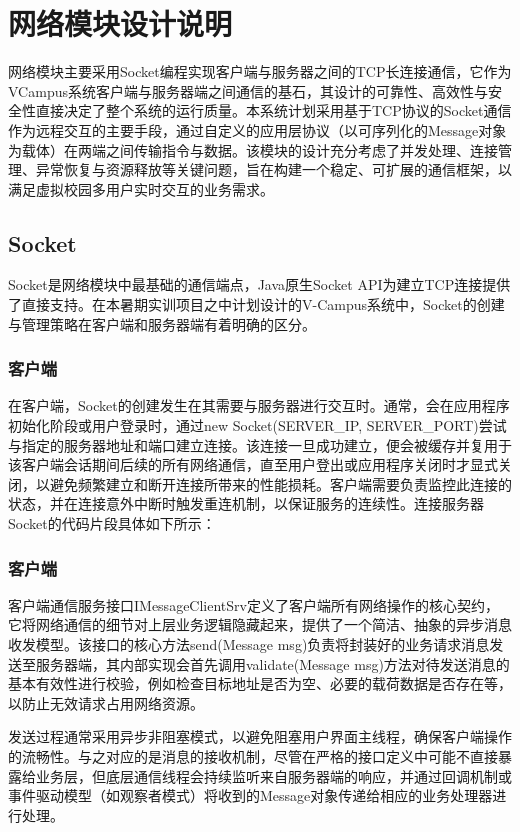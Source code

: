 \ifx\maindoc\undefined
{}
\fi

\section{网络模块设计说明}
网络模块主要采用Socket编程实现客户端与服务器之间的TCP长连接通信，它作为VCampus系统客户端与服务器端之间通信的基石，其设计的可靠性、高效性与安全性直接决定了整个系统的运行质量。本系统计划采用基于TCP协议的Socket通信作为远程交互的主要手段，通过自定义的应用层协议（以可序列化的Message对象为载体）在两端之间传输指令与数据。该模块的设计充分考虑了并发处理、连接管理、异常恢复与资源释放等关键问题，旨在构建一个稳定、可扩展的通信框架，以满足虚拟校园多用户实时交互的业务需求。
\subsection{Socket}
Socket是网络模块中最基础的通信端点，Java原生Socket API为建立TCP连接提供了直接支持。在本暑期实训项目之中计划设计的V-Campus系统中，Socket的创建与管理策略在客户端和服务器端有着明确的区分。
\subsubsection{客户端}
在客户端，Socket的创建发生在其需要与服务器进行交互时。通常，会在应用程序初始化阶段或用户登录时，通过new Socket(SERVER_IP, SERVER_PORT)尝试与指定的服务器地址和端口建立连接。该连接一旦成功建立，便会被缓存并复用于该客户端会话期间后续的所有网络通信，直至用户登出或应用程序关闭时才显式关闭，以避免频繁建立和断开连接所带来的性能损耗。客户端需要负责监控此连接的状态，并在连接意外中断时触发重连机制，以保证服务的连续性。连接服务器Socket的代码片段具体如下所示：

\subsubsection{客户端}
客户端通信服务接口IMessageClientSrv定义了客户端所有网络操作的核心契约，它将网络通信的细节对上层业务逻辑隐藏起来，提供了一个简洁、抽象的异步消息收发模型。该接口的核心方法send(Message msg)负责将封装好的业务请求消息发送至服务器端，其内部实现会首先调用validate(Message msg)方法对待发送消息的基本有效性进行校验，例如检查目标地址是否为空、必要的载荷数据是否存在等，以防止无效请求占用网络资源。

发送过程通常采用异步非阻塞模式，以避免阻塞用户界面主线程，确保客户端操作的流畅性。与之对应的是消息的接收机制，尽管在严格的接口定义中可能不直接暴露给业务层，但底层通信线程会持续监听来自服务器端的响应，并通过回调机制或事件驱动模型（如观察者模式）将收到的Message对象传递给相应的业务处理器进行处理。

